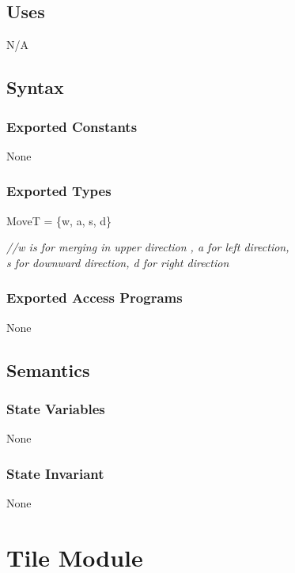 \documentclass[12pt]{article}
\begin{document}
\subsection* {Uses}

N/A

\subsection* {Syntax}

\subsubsection* {Exported Constants}

None

\subsubsection* {Exported Types}

MoveT = \{w, a, s, d\}

\medskip

\noindent \textit{//w is for merging in upper direction , a for left direction,\\
 			s for downward direction, d for right direction}

\subsubsection* {Exported Access Programs}

None

\subsection* {Semantics}

\subsubsection* {State Variables}

None

\subsubsection* {State Invariant}

None

\newpage

\section* {Tile Module}
\end{document}

